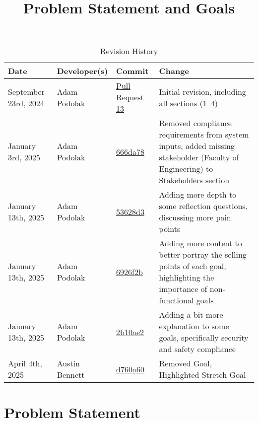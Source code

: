 \documentclass{article}
\title{Problem Statement and Goals\\\progname}
\author{\authname}
\date{}
\begin{document}
\maketitle

\begin{table}[htp]
\centering
\caption{Revision History}
\label{TblRevisionHistory}
\begin{tabularx}{\textwidth}{l l l X}
\toprule
\textbf{Date} & \textbf{Developer(s)} & \textbf{Commit} & \textbf{Change}\\

\midrule
September 23rd, 2024 & 
Adam Podolak & 
\href{https://github.com/ausbennett/mes-finance-platform/pull/13}{Pull Request 13} & 
Initial revision, including all sections (1--4)\\

\midrule
January 3rd, 2025 & 
Adam Podolak & 
\href{https://github.com/ausbennett/mes-finance-platform/commit/666da787738895e3392ffbe10d2a7d6c53701e13}{666da78} & Removed compliance requirements from system inputs, added missing stakeholder (Faculty of Engineering) to Stakeholders section \\
\midrule
January 13th, 2025 & Adam Podolak & \href{https://github.com/ausbennett/mes-finance-platform/commit/53628d3bd8a64abb09b5a6c65c08ec7370897a2b}{53628d3} & Adding more depth to some reflection questions, discussing more pain points\\
\midrule
January 13th, 2025 & Adam Podolak & \href{https://github.com/ausbennett/mes-finance-platform/commit/6926f2bbaac0a97c0324a255ad4b39b515b7720f}{6926f2b} & Adding more content to better portray the selling points of each goal, highlighting the importance of non-functional goals\\
\midrule
January 13th, 2025 & Adam Podolak & \href{https://github.com/ausbennett/mes-finance-platform/commit/2b10ae263dd3b3216ef9374a9cb35519ddf44b7a}{2b10ae2} & Adding a bit more explanation to some goals, specifically security and safety compliance\\
\midrule
April 4th, 2025 & Austin Bennett & \href{https://github.com/ausbennett/mes-finance-platform/commit/4762d68a4aacebe09f75feebe8afbe9bfd760a60}{d760a60} & Removed Goal, Highlighted Stretch Goal\\


\bottomrule
\end{tabularx}
\end{table}

\section{Problem Statement}
\end{document}
